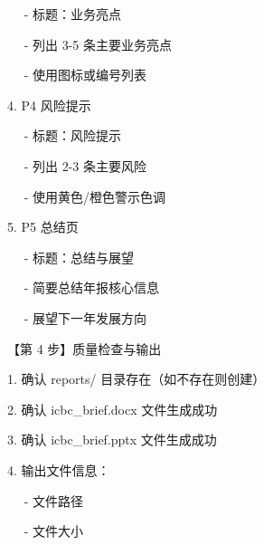 \documentclass[
  american,
  chinese,
]{ctexart}
\begin{document}
\foreignlanguage{american}{{~~ }- }{标题：业务亮点}\foreignlanguage{american}{}

\foreignlanguage{american}{{~~ }- }{列出}\foreignlanguage{american}{ 3-5 }{条主要业务亮点}\foreignlanguage{american}{}

\foreignlanguage{american}{{~~ }- }{使用图标或编号列表}\foreignlanguage{american}{}

\foreignlanguage{american}{4. P4 }{风险提示}\foreignlanguage{american}{}

\foreignlanguage{american}{{~~ }- }{标题：风险提示}\foreignlanguage{american}{}

\foreignlanguage{american}{{~~ }- }{列出}\foreignlanguage{american}{ 2-3 }{条主要风险}\foreignlanguage{american}{}

\foreignlanguage{american}{{~~ }- }{使用黄色}\foreignlanguage{american}{/}{橙色警示色调}\foreignlanguage{american}{}

\foreignlanguage{american}{5. P5 }{总结页}\foreignlanguage{american}{}

\foreignlanguage{american}{{~~ }- }{标题：总结与展望}\foreignlanguage{american}{}

\foreignlanguage{american}{{~~ }- }{简要总结年报核心信息}\foreignlanguage{american}{}

\foreignlanguage{american}{{~~ }- }{展望下一年发展方向}\foreignlanguage{american}{}

{【第}\foreignlanguage{american}{ 4 }{步】质量检查与输出}\foreignlanguage{american}{}

\foreignlanguage{american}{1. }{\foreignlanguage{american}{确认}}\foreignlanguage{american}{ reports/ }{\foreignlanguage{american}{目录存在（如不存在则创建}}\foreignlanguage{american}{）}\foreignlanguage{american}{}

\foreignlanguage{american}{2. }{\foreignlanguage{american}{确认}}\foreignlanguage{american}{ icbc\_brief.docx }{\foreignlanguage{american}{文件生成成功}}\foreignlanguage{american}{}

\foreignlanguage{american}{3. }{\foreignlanguage{american}{确认}}\foreignlanguage{american}{ icbc\_brief.pptx }{\foreignlanguage{american}{文件生成成功}}\foreignlanguage{american}{}

\foreignlanguage{american}{4. }{\foreignlanguage{american}{输出文件信息}}\foreignlanguage{american}{：}\foreignlanguage{american}{}

\foreignlanguage{american}{{~~ }- }{\foreignlanguage{american}{文件路径}}\foreignlanguage{american}{}

\foreignlanguage{american}{{~~ }- }{\foreignlanguage{american}{文件大小}}\foreignlanguage{american}{}
\end{document}
